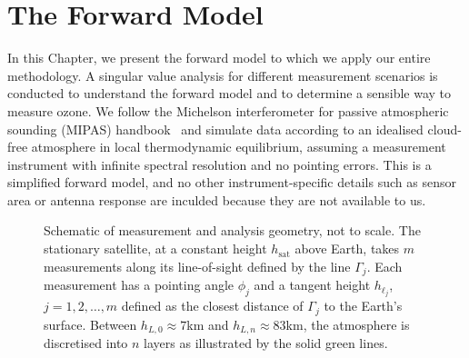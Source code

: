 \chapter{The Forward Model}
\label{ch:formodel}
\thispagestyle{empty}

In this Chapter, we present the forward model to which we apply our entire methodology.
A singular value analysis for different measurement scenarios is conducted to understand the forward model and to determine a sensible way to measure ozone. We follow the Michelson interferometer for passive atmospheric sounding (MIPAS) handbook~\cite{mipas2000handbook} and simulate data according to an idealised cloud-free atmosphere in local thermodynamic equilibrium, assuming a measurement instrument with infinite spectral resolution and no pointing errors.
This is a simplified forward model, and no other instrument-specific details such as sensor area or antenna response are inculded because they are not available to us. 
\begin{figure}[ht!]
	\centering
	
	\caption[Schematic of measurement and analysis geometry.]{Schematic of measurement and analysis geometry, not to scale.
		The stationary satellite, at a constant height $h_\text{sat}$ above Earth, takes $m$ measurements along its line-of-sight defined by the line $\Gamma_j$.
		Each measurement has a pointing angle $\phi_j$ and a tangent height $h_{\ell_j}$, $j=1,2,\dots,m$ defined as the closest distance of $\Gamma_j$ to the Earth's surface.
		Between $h_{L,0} \approx 7$km and $h_{L,n} \approx 83$km, the atmosphere is discretised into $n$ layers as illustrated by the solid green lines.}
	\label{fig:LIMB}
\end{figure}

